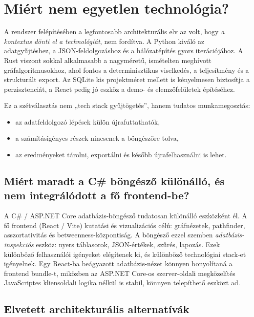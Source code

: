 ﻿\documentclass[a4paper,12pt]{report}
\begin{document}
\section{Miért nem egyetlen technológia?}

A rendszer felépítésében a legfontosabb architekturális elv az volt, hogy \emph{a kontextus dönti el a technológiát}, nem fordítva. A Python kiváló az adatgyűjtéshez, a JSON-feldolgozáshoz és a hálózatépítés gyors iterációjához. A Rust viszont sokkal alkalmasabb a nagyméretű, ismételten meghívott gráfalgoritmusokhoz, ahol fontos a determinisztikus viselkedés, a teljesítmény és a strukturált export. Az SQLite kis projektméret mellett is kényelmesen biztosítja a perzisztenciát, a React pedig jó eszköz a demo- és elemzőfelületek építéséhez.

Ez a szétválasztás nem „tech stack gyűjtögetés”, hanem tudatos munkamegosztás:

\begin{itemize}
    \item az adatfeldolgozó lépések külön újrafuttathatók,
    \item a számításigényes részek nincsenek a böngészőre tolva,
    \item az eredményeket tárolni, exportálni és később újrafelhasználni is lehet.
\end{itemize}

\subsection{Miért maradt a C\# böngésző különálló, és nem integrálódott a fő frontend-be?}

A C\# / ASP.NET Core adatbázis-böngésző tudatosan különálló eszközként él. A fő frontend (React / Vite) kutatási és vizualizációs célú: gráfnézetek, pathfinder, asszortativitás és betweenness-központiság. A böngésző ezzel szemben \emph{adatbázis-inspekciós} eszköz: nyers táblasorok, JSON-értékek, szűrés, lapozás. Ezek különböző felhasználói igényeket elégítenek ki, és különböző technológiai stack-et igényelnek. Egy React-ba beágyazott adatbázis-nézet könnyen bonyolítaná a frontend bundle-t, miközben az ASP.NET Core-os szerver-oldali megközelítés JavaScriptes kliensoldali logika nélkül is stabil, könnyen telepíthető eszközt ad.

\subsection{Elvetett architekturális alternatívák}
\end{document}
